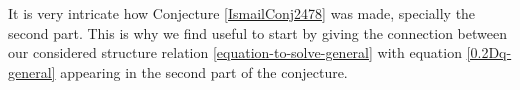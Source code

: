 \documentclass{amsart}
\newtheorem{theorem}{Theorem}[section]
\theoremstyle{remark}
\numberwithin{equation}{section}
\begin{document}
%

It is very intricate how Conjecture \ref{IsmailConj2478} was made, specially the second part. This is why we find useful to start by giving the connection between our considered structure relation \eqref{equation-to-solve-general} with equation \eqref{0.2Dq-general} appearing in the second part of the conjecture.
\end{document}
